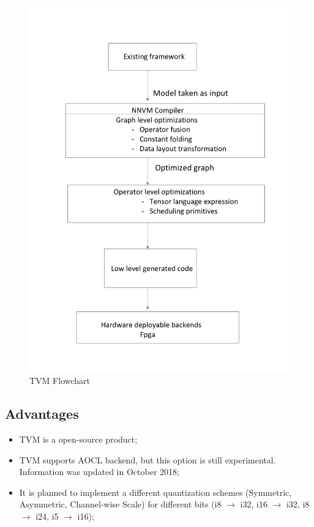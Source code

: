 \documentclass[titlepage]{report}
\begin{document}
\begin{figure}[h!]
    \centering
    \includegraphics[scale=0.19]{TVM_Flowchart.jpg}
    \caption{TVM Flowchart}
\end{figure}
 
 \subsection{Advantages}
 \begin{itemize}
 \item TVM is a open-source product;
 \item TVM supports AOCL backend, but this option is still experimental. Information was updated in October 2018;
  \item It is planned to implement a different quantization schemes (Symmetric, Asymmetric, Channel-wise Scale) for different bits (i8 $\to$ i32, i16 $\to$ i32, i8 $\to$ i24, i5 $\to$ i16);
 \end{itemize}
\end{document}
